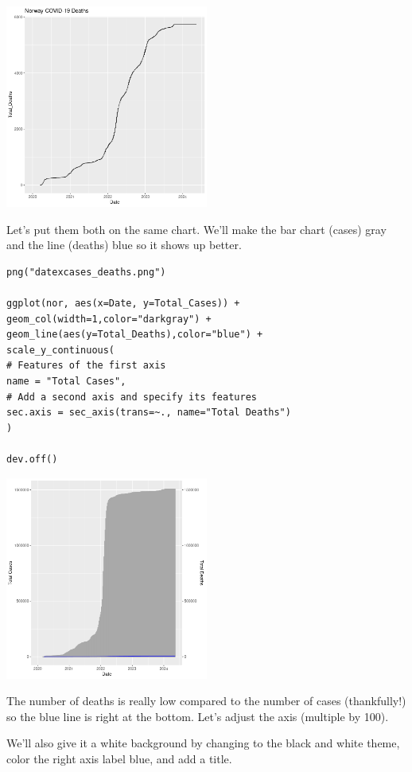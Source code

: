 \documentclass[
]{book}
\begin{document}
\includegraphics[width=0.5\textwidth,height=\textheight]{./Figures/datexdeaths.png}

Let's put them both on the same chart. We'll make the bar chart (cases) gray and the line (deaths) blue so it shows up better.

\begin{verbatim}
png("datexcases_deaths.png")

ggplot(nor, aes(x=Date, y=Total_Cases)) +
geom_col(width=1,color="darkgray") +
geom_line(aes(y=Total_Deaths),color="blue") +
scale_y_continuous(
# Features of the first axis
name = "Total Cases",
# Add a second axis and specify its features
sec.axis = sec_axis(trans=~., name="Total Deaths")
)

dev.off()
\end{verbatim}

\includegraphics[width=0.5\textwidth,height=\textheight]{./Figures/datexcases_deaths.png}

The number of deaths is really low compared to the number of cases (thankfully!) so the blue line is right at the bottom. Let's adjust the axis (multiple by 100).

We'll also give it a white background by changing to the black and white theme, color the right axis label blue, and add a title.
\end{document}
